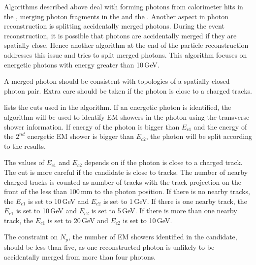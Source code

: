 Algorithms described above deal with forming photons from calorimeter hits in the \ECAL, merging photon fragments in the \ECAL and the \HCAL. Another aspect in photon reconstruction is splitting accidentally merged photons. During the event reconstruction, it is possible that photons are accidentally merged if they are spatially close. Hence another algorithm at the end of the particle reconstruction addresses this issue and tries to split merged photons. This algorithm focuses on energetic photons with energy greater than 10\,GeV.

A merged photon should be consistent with topologies of a spatially closed photon pair. Extra care should be taken if the photon is close to a charged tracks.


 lists the cuts used in the algorithm.  If an energetic photon is identified, the \peakFinding algorithm will  be used to identify EM showers in the photon using the transverse shower information. If energy of the photon is bigger than $E_{c1}$ and the energy of the $2^{nd}$ energetic EM shower is bigger than $E_{c2}$, the photon will be split according to the \peakFinding results.

The values of $E_{c1}$ and $E_{c2}$ depends on if the photon is close to a charged track. The cut is more careful if the candidate is close to tracks. The number of nearby charged tracks is counted as number of tracks with the track projection on the front of the \ECAL less than 100\,mm to the photon position. If there is no nearby tracks, the $E_{c1}$ is set to 10\,GeV and $E_{c2}$ is set to 1\,GeV. If there is one nearby track, the $E_{c1}$ is set to 10\,GeV and $E_{c2}$ is set to 5\,GeV. If there is more than one nearby track, the $E_{c1}$ is set to 20\,GeV and $E_{c2}$ is set to 10\,GeV.


The constraint on $N_{p}$, the number of EM showers identified in the candidate, should be less than five, as one reconstructed photon is unlikely to be accidentally merged from more than four photons.


